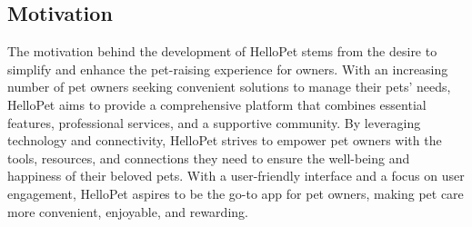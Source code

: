 \subsection{Motivation}
The motivation behind the development of HelloPet stems from the desire to simplify and enhance the pet-raising experience for owners. With an increasing number of pet owners seeking convenient solutions to manage their pets' needs, HelloPet aims to provide a comprehensive platform that combines essential features, professional services, and a supportive community. By leveraging technology and connectivity, HelloPet strives to empower pet owners with the tools, resources, and connections they need to ensure the well-being and happiness of their beloved pets. With a user-friendly interface and a focus on user engagement, HelloPet aspires to be the go-to app for pet owners, making pet care more convenient, enjoyable, and rewarding.

